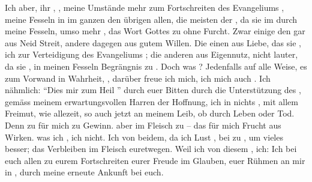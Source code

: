 Ich  aber,  ihr , ,  meine Umstände mehr zum Fortschreiten des Evangeliums ,  meine Fesseln  in   im ganzen   den übrigen allen,   die meisten der , da sie im   durch meine Fesseln, umso mehr , das Wort Gottes zu  ohne Furcht. Zwar  einige den  gar aus Neid  Streit, andere dagegen aus gutem Willen. Die einen aus Liebe, das sie ,  ich zur Verteidigung des Evangeliums  ; die anderen   aus Eigennutz, nicht lauter, da sie ,  in meinen Fesseln Begrängnis zu . Doch was ? Jedenfalls  auf alle Weise,  es zum Vorwand  in Wahrheit,  ,  darüber freue ich mich, ich  mich auch  . Ich  nähmlich: \enquote{Dies  mir zum Heil } durch euer Bitten  durch die Unterstützung des , gemäss meinem erwartungsvollen Harren  der Hoffnung,  ich in nichts ,  mit allem Freimut, wie allezeit, so auch jetzt   an meinem Leib, ob durch Leben oder Tod. Denn zu  für mich   zu  Gewinn.  aber im Fleisch zu  -- das  für mich Frucht aus  Wirken.  was ich ,  ich nicht. Ich  von beidem, da ich Lust ,   bei  zu ,   um vieles besser;  das Verbleiben im Fleisch  euretwegen. Weil ich von diesem ,  ich: Ich   bei euch allen  zu eurem Fortschreiten  eurer Freude im Glauben,  euer Rühmen an mir in ,  durch meine erneute Ankunft bei euch.

